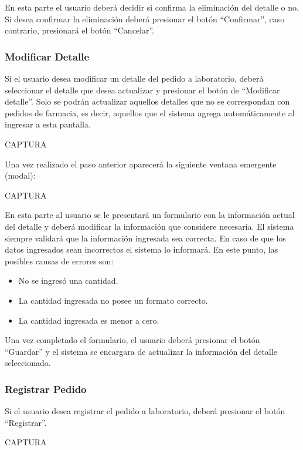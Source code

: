 \documentclass[letterpaper,10pt,spanish]{sphinxmanual}
\begin{document}
En esta parte el usuario deberá decidir si confirma la eliminación del detalle o no. Si desea confirmar la eliminación deberá presionar el botón “Confirmar”, caso contrario, presionará el botón “Cancelar”.


\subsubsection{Modificar Detalle}
\label{pedidosalab:modificar-detalle}
Si el usuario desea modificar un detalle del pedido a laboratorio, deberá seleccionar el detalle que desea actualizar y presionar el botón de “Modificar detalle”. Solo se podrán actualizar aquellos detalles que no se correspondan con pedidos de farmacia, es decir, aquellos que el sistema agrega automáticamente al ingresar a esta pantalla.

CAPTURA

Una vez realizado el paso anterior aparecerá la siguiente ventana emergente (modal):

CAPTURA

En esta parte al usuario se le presentará un formulario con la información actual del detalle y deberá modificar la información que considere necesaria.
El sistema siempre validará que la información ingresada sea correcta. En caso de que los datos ingresados sean incorrectos el sistema lo informará.
En este punto, las posibles causas de errores son:
\begin{itemize}
\item {} 
No se ingresó una cantidad.

\item {} 
La cantidad ingresada no posee un formato correcto.

\item {} 
La cantidad ingresada es menor a cero.

\end{itemize}

Una vez completado el formulario, el usuario deberá presionar el botón “Guardar” y el sistema se encargara de actualizar la información del detalle seleccionado.


\subsubsection{Registrar Pedido}
\label{pedidosalab:registrar-pedido}
Si el usuario desea registrar el pedido a laboratorio, deberá presionar el botón “Registrar”.

CAPTURA
\end{document}
